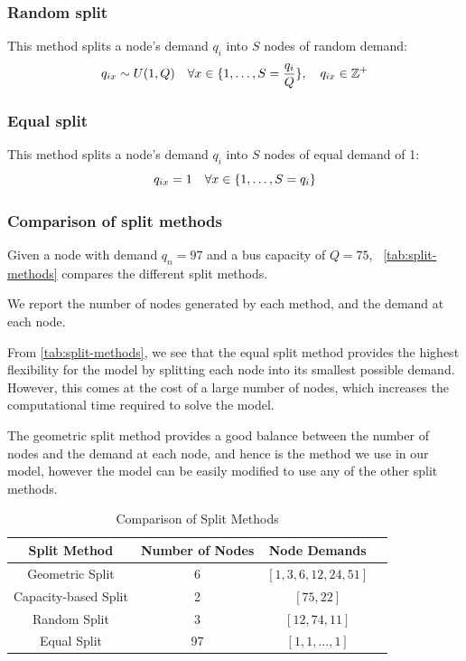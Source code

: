 \documentclass[12pt]{article}
\begin{document}
\subsubsection{Random split}
This method splits a node's demand $q_i$ into $S$ nodes of random demand:
\begin{equation}
    q_{ix} \sim U(1, Q) \quad \forall x \in \{1, \dots, S = \frac{q_{i}}{Q}\}, \quad q_{ix} \in \mathbb{Z}^+\\
\end{equation}

\subsubsection{Equal split}
This method splits a node's demand $q_i$ into $S$ nodes of equal demand of 1:
\begin{equation}
    q_{ix} = 1 \quad \forall x \in \{1, \dots, S = q_{i}\} \\
\end{equation}

\subsubsection{Comparison of split methods}
Given a node with demand $q_n = 97$ and a bus capacity of $Q = 75$, ~\autoref{tab:split-methods} compares the different split methods.

We report the number of nodes generated by each method, and the demand at each node.

From \autoref{tab:split-methods}, we see that the equal split method provides the highest flexibility for the model by splitting each node into its smallest possible demand. However, this comes at the cost of a large number of nodes, which increases the computational time required to solve the model.

The geometric split method provides a good balance between the number of nodes and the demand at each node, and hence is the method we use in our model, however the model can be easily modified to use any of the other split methods.

\begin{table}[htbp]
    \centering
    \begin{tabular}{|c|c|c|c|}
        \hline
        \textbf{Split Method} & \textbf{Number of Nodes} & \textbf{Node Demands}   \\
        \hline
        Geometric Split       & 6                        & $[1, 3, 6, 12, 24, 51]$ \\
        \hline
        Capacity-based Split  & 2                        & $[75, 22]$              \\
        \hline
        Random Split          & 3                        & $[12, 74, 11]$          \\
        \hline
        Equal Split           & 97                       & $[1, 1, ..., 1]$        \\
        \hline
    \end{tabular}
    \caption{Comparison of Split Methods}
    \label{tab:split-methods}
\end{table}
\end{document}

